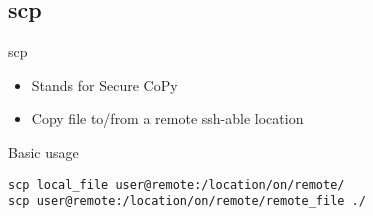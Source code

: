 \subsection{scp}

\begin{frame}[fragile]{scp}
  \begin{itemize}
    \pause \item Stands for Secure CoPy
    \pause \item Copy  file to/from a remote ssh-able location
  \end{itemize}
  \pause

  \begin{exampleblock}{Basic usage}
    \begin{lstlisting}[showstringspaces=false,basicstyle=\tiny]
scp local_file user@remote:/location/on/remote/
scp user@remote:/location/on/remote/remote_file ./
    \end{lstlisting}
  \end{exampleblock}
\end{frame}


